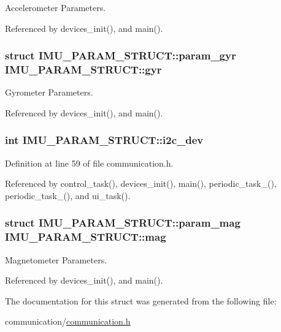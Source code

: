 Accelerometer Parameters. 



Referenced by devices\_\-init(), and main().

\hypertarget{structIMU__PARAM__STRUCT_a5a4557868f1af679a1098808397b02ec}{
\subsubsection[{gyr}]{\setlength{\rightskip}{0pt plus 5cm}struct {\bf IMU\_\-PARAM\_\-STRUCT::param\_\-gyr} {\bf IMU\_\-PARAM\_\-STRUCT::gyr}}}
\label{structIMU__PARAM__STRUCT_a5a4557868f1af679a1098808397b02ec}


Gyrometer Parameters. 



Referenced by devices\_\-init(), and main().

\hypertarget{structIMU__PARAM__STRUCT_a8a870f383fc9ba0b682fdc9b8c0d2734}{
\subsubsection[{i2c\_\-dev}]{\setlength{\rightskip}{0pt plus 5cm}int {\bf IMU\_\-PARAM\_\-STRUCT::i2c\_\-dev}}}
\label{structIMU__PARAM__STRUCT_a8a870f383fc9ba0b682fdc9b8c0d2734}


Definition at line 59 of file communication.h.



Referenced by control\_\-task(), devices\_\-init(), main(), periodic\_\-task\_(), periodic\_\-task\_(), and ui\_\-task().

\hypertarget{structIMU__PARAM__STRUCT_a26b277dcaf05f3842995df888225f6f4}{
\subsubsection[{mag}]{\setlength{\rightskip}{0pt plus 5cm}struct {\bf IMU\_\-PARAM\_\-STRUCT::param\_\-mag} {\bf IMU\_\-PARAM\_\-STRUCT::mag}}}
\label{structIMU__PARAM__STRUCT_a26b277dcaf05f3842995df888225f6f4}


Magnetometer Parameters. 



Referenced by devices\_\-init(), and main().



The documentation for this struct was generated from the following file:\begin{DoxyCompactItemize}
\item 
communication/\hyperlink{communication_8h}{communication.h}\end{DoxyCompactItemize}
